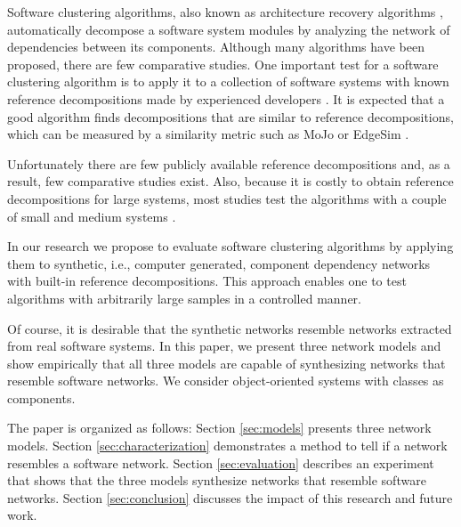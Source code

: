 Software clustering algorithms, also known as architecture recovery algorithms
\cite{Mancoridis1998,Anquetil1999,Tzerpos2000,Andritsos2005},
automatically decompose a software system modules by analyzing the network of
dependencies between its components.  Although many algorithms have been
proposed, there are few comparative studies.
One important test for a software clustering algorithm is to apply it to a
collection of software systems with known reference decompositions made by
experienced developers \cite{Anquetil1999}. It is expected that a good algorithm
finds decompositions that are similar to reference decompositions, which can be
measured by a similarity metric such as MoJo \cite{Tzerpos1999} or EdgeSim
\cite{Mitchell2001}.

Unfortunately there are few publicly available reference decompositions
\cite{Koschke2000} and, as a result, few comparative studies exist. Also,
because it is costly to obtain reference decompositions for large systems, most
studies test the algorithms with a couple of small and medium systems
\cite{Anquetil1999,Maqbool2007,Bittencourt2009}.

In our research we propose to evaluate software clustering algorithms by
applying them to synthetic, i.e., computer generated, component dependency
networks with built-in reference decompositions. This approach enables one to
test algorithms with arbitrarily large samples in a controlled manner.

Of course, it is desirable that the synthetic networks resemble networks
extracted from real software systems. In this paper, we present three network
models and show empirically that all three models are capable of synthesizing
networks that resemble software networks. We consider object-oriented systems
with classes as components.

The paper is organized as follows:
Section \ref{sec:models} presents three network models.
%
Section \ref{sec:characterization} demonstrates a method to tell if a network
resembles a software network.
%
Section \ref{sec:evaluation} describes an experiment that shows that the three
models synthesize networks that resemble software networks.
%
Section \ref{sec:conclusion} discusses the impact of this research and future
work.


